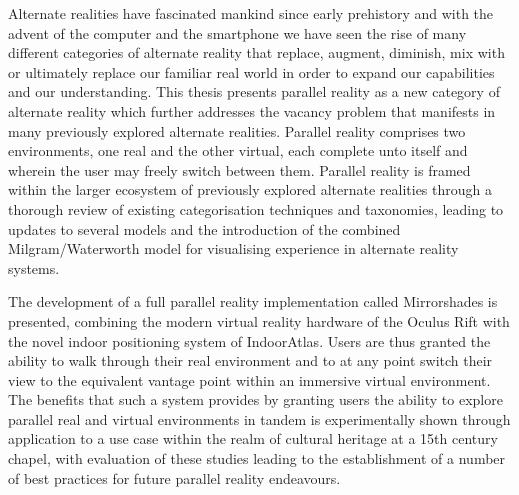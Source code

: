 Alternate realities have fascinated mankind since early prehistory and with the advent of the computer and the smartphone we have seen the rise of many different categories of alternate reality that replace, augment, diminish, mix with or ultimately replace our familiar real world in order to expand our capabilities and our understanding. This thesis presents parallel reality as a new category of alternate reality which further addresses the vacancy problem that manifests in many previously explored alternate realities. Parallel reality comprises two environments, one real and the other virtual, each complete unto itself and wherein the user may freely switch between them. Parallel reality is framed within the larger ecosystem of previously explored alternate realities through a thorough review of existing categorisation techniques and taxonomies, leading to updates to several models and the introduction of the combined Milgram/Waterworth model for visualising experience in alternate reality systems.

The development of a full parallel reality implementation called Mirrorshades is presented, combining the modern virtual reality hardware of the Oculus Rift with the novel indoor positioning system of IndoorAtlas. Users are thus granted the ability to walk through their real environment and to at any point switch their view to the equivalent vantage point within an immersive virtual environment. The benefits that such a system provides by granting users the ability to explore parallel real and virtual environments in tandem is experimentally shown through application to a use case within the realm of cultural heritage at a 15th century chapel, with evaluation of these studies leading to the establishment of a number of best practices for future parallel reality endeavours.